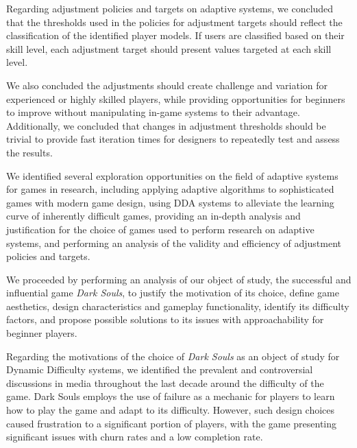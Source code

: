 Regarding adjustment policies and targets on adaptive systems, we concluded that the thresholds used in the policies for adjustment targets should reflect the classification of the identified player models. If users are classified based on their skill level, each adjustment target should present values targeted at each skill level.

We also concluded the adjustments should create challenge and variation for experienced or highly skilled players, while providing opportunities for beginners to improve without manipulating in-game systems to their advantage. Additionally, we concluded that changes in adjustment thresholds should be trivial to provide fast iteration times for designers to repeatedly test and assess the results.

We identified several exploration opportunities on the field of adaptive systems for games in research, including applying adaptive algorithms to sophisticated games with modern game design, using DDA systems to alleviate the learning curve of inherently difficult games, providing an in-depth analysis and justification for the choice of games used to perform research on adaptive systems, and performing an analysis of the validity and efficiency of adjustment policies and targets.


We proceeded by performing an analysis of our object of study, the successful and influential game \emph{Dark Souls}, to justify the motivation of its choice, define game aesthetics, design characteristics and gameplay functionality, identify its difficulty factors, and propose possible solutions to its issues with approachability for beginner players.

Regarding the motivations of the choice of \emph{Dark Souls} as an object of study for Dynamic Difficulty systems, we identified the prevalent and controversial discussions in media throughout the last decade around the difficulty of the game. Dark Souls employs the use of failure as a mechanic for players to learn how to play the game and adapt to its difficulty. However, such design choices caused frustration to a significant portion of players, with the game presenting significant issues with churn rates and a low completion rate.

